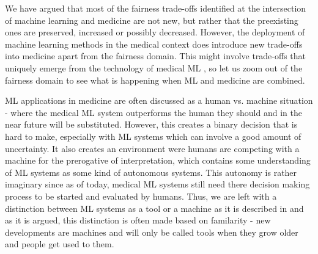 
We have argued that most of the fairness trade-offs identified at the intersection of machine learning and medicine are not new, but rather that the preexisting ones are preserved, increased or possibly decreased. However, the deployment of machine learning methods in the medical context does introduce new trade-offs into medicine apart from the fairness domain. This might involve trade-offs that uniquely emerge from the technology of medical ML \cite{Dijkstra2020}, so let us zoom out of the fairness domain to see what is happening when ML and medicine are combined. 

ML applications in medicine are often discussed as a human vs. machine situation - where the medical ML system outperforms the human they should and in the near future will be substituted. However, this creates a binary decision that is hard to make, especially with ML systems which can involve a good amount of uncertainty. It also creates an environment were humans are competing with a machine for the prerogative of interpretation, which contains some understanding of ML systems as some kind of autonomous systems. This autonomy is rather imaginary since as of today, medical ML systems still need there decision making process to be started and evaluated by humans. Thus, we are left with a distinction between ML systems as a tool or a machine as it is described in \cite{Williamson2021} and as it is argued, this distinction is often made based on familarity - new developments are machines and will only be called tools when they grow older and people get used to them. 

